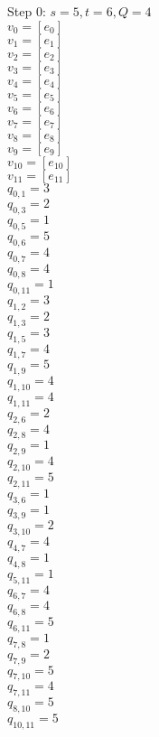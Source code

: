 Step 0:
$s=5,t=6,Q=4$\\
$v_{0}=[e_{0}]$\\
$v_{1}=[e_{1}]$\\
$v_{2}=[e_{2}]$\\
$v_{3}=[e_{3}]$\\
$v_{4}=[e_{4}]$\\
$v_{5}=[e_{5}]$\\
$v_{6}=[e_{6}]$\\
$v_{7}=[e_{7}]$\\
$v_{8}=[e_{8}]$\\
$v_{9}=[e_{9}]$\\
$v_{10}=[e_{10}]$\\
$v_{11}=[e_{11}]$\\
$q_{0,1}=3$\\
$q_{0,3}=2$\\
$q_{0,5}=1$\\
$q_{0,6}=5$\\
$q_{0,7}=4$\\
$q_{0,8}=4$\\
$q_{0,11}=1$\\
$q_{1,2}=3$\\
$q_{1,3}=2$\\
$q_{1,5}=3$\\
$q_{1,7}=4$\\
$q_{1,9}=5$\\
$q_{1,10}=4$\\
$q_{1,11}=4$\\
$q_{2,6}=2$\\
$q_{2,8}=4$\\
$q_{2,9}=1$\\
$q_{2,10}=4$\\
$q_{2,11}=5$\\
$q_{3,6}=1$\\
$q_{3,9}=1$\\
$q_{3,10}=2$\\
$q_{4,7}=4$\\
$q_{4,8}=1$\\
$q_{5,11}=1$\\
$q_{6,7}=4$\\
$q_{6,8}=4$\\
$q_{6,11}=5$\\
$q_{7,8}=1$\\
$q_{7,9}=2$\\
$q_{7,10}=5$\\
$q_{7,11}=4$\\
$q_{8,10}=5$\\
$q_{10,11}=5$\\
